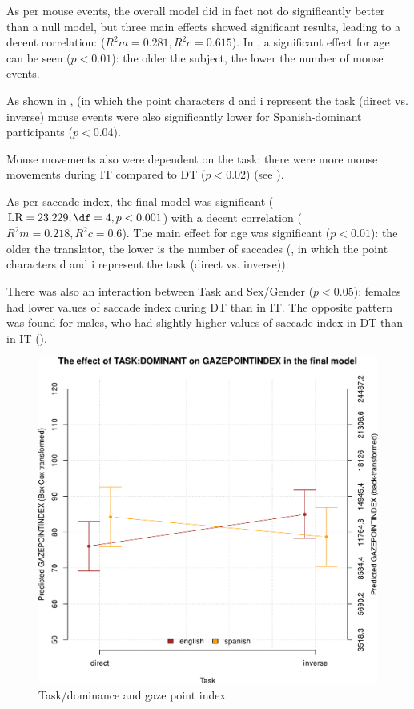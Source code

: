 \documentclass[output=paper]{langscibook}
\begin{document}
As per mouse events, the overall model did in fact not do significantly better than a null model, but three main effects showed significant results, leading to a decent correlation: ($R^2m = 0.281, R^2c = 0.615$). In , a significant effect for age can be seen ($p < 0.01$): the older the subject, the lower the number of mouse events.

As shown in , (in which the point characters d and i represent the task (direct vs. inverse) mouse events were also significantly lower for Spanish-dominant participants ($p < 0.04$). 

Mouse movements also were dependent on the task: there were more mouse movements during IT compared to DT ($p < 0.02$) (see ).

As per saccade index, the final model was significant ($\text{LR} = 23.229, \df = 4, p < 0.001$) with a decent correlation ($R^2m = 0.218, R^2c = 0.6$). The main effect for age was significant ($p < 0.01$): the older the translator, the lower is the number of saccades (, in which the point characters d and i represent the task (direct vs. inverse)).

There was also an interaction between Task and Sex/Gender ($p < 0.05$): females had lower values of saccade index during DT than in IT. The opposite pattern was found for males, who had slightly higher values of saccade index in DT than in IT (). 

\begin{figure}
        \includegraphics[height=.45\textheight]{figures/Ferreira-Figure1.4.pdf}
        \caption{Task/dominance and gaze point index\label{fig4h}}
\end{figure}
\end{document}
